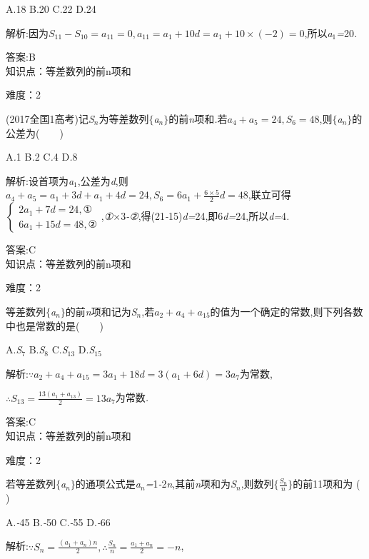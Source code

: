 \documentclass{article} %
\begin{document}
 A.18 B.20 C.22 D.24

 解析:因为$S_{11}-S_{10}=a_{11}=0,a_{11}=a_1+10d=a_1+10\times (-2)=0$,所以\textit{a}${}_{1}$\textit{=}20\textit{.}

 答案:B \\

知识点：等差数列的前n项和

难度：2

 (2017全国1高考)记\textit{S${}_{n}$}为等差数列$\mathrm{\{}$\textit{a${}_{n}$}$\mathrm{\}}$的前\textit{n}项和\textit{.}若$a_4+a_5=24,S_6=48$,则$\mathrm{\{}$\textit{a${}_{n}$}$\mathrm{\}}$的公差为(\textit{　　})

 A\textit{.}1 B\textit{.}2 C\textit{.}4 D\textit{.}8

 解析:设首项为\textit{a}${}_{1}$,公差为\textit{d},则$a_4+a_5=a_1+3d+a_1+4d=24,S_6=6a_1+\frac{6\times 5}{2}d=48$,联立可得$\left\{
\begin{array}{l}
2a_1+7d=24, ① \\
6a_1+15d=48, ②
\end{array}
\right.$,\textit{①$\times$}3\textit{-②},得(21\textit{-}15)\textit{d=}24,即6\textit{d=}24,所以\textit{d=}4\textit{.}
 
 答案:C \\

知识点：等差数列的前n项和

难度：2

 等差数列$\mathrm{\{}$\textit{a${}_{n}$}$\mathrm{\}}$的前\textit{n}项和记为\textit{S${}_{n}$},若$a_2+a_4+a_{15}$的值为一个确定的常数,则下列各数中也是常数的是(\textit{　　})

 A.\textit{S}${}_{7}$ B.\textit{S}${}_{8}$ C.\textit{S}${}_{13}$ D.\textit{S}${}_{15}$

 解析:$\because a_2+a_4+a_{15}=3a_1+18d=3(a_1+6d)=3a_7$为常数,

$\therefore S_{13}=\frac{13(a_1+a_{13})}{2}=13a_7$为常数\textit{.}

 答案:C \\

知识点：等差数列的前n项和

难度：2

 若等差数列$\mathrm{\{}$\textit{a${}_{n}$}$\mathrm{\}}$的通项公式是\textit{a${}_{n}$=}1\textit{-}2\textit{n},其前\textit{n}项和为\textit{S${}_{n}$},则数列$\{\frac{S_n}{n}\}$的前11项和为 (\textit{　　})

 A.\textit{-}45 B.\textit{-}50 C.\textit{-}55 D.\textit{-}66

 解析:$\because S_n=\frac{(a_1+a_n)n}{2},\therefore \frac{S_n}{n}=\frac{a_1+a_n}{2}=-n$,
\end{document}
